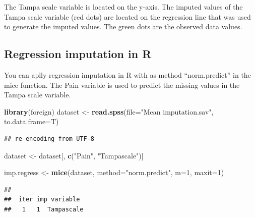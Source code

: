 \documentclass[]{book}
\newenvironment{Shaded}{\begin{snugshade}}{\end{snugshade}}
\newcommand{\KeywordTok}[1]{\textcolor[rgb]{0.13,0.29,0.53}{\textbf{#1}}}
\newcommand{\DataTypeTok}[1]{\textcolor[rgb]{0.13,0.29,0.53}{#1}}
\newcommand{\DecValTok}[1]{\textcolor[rgb]{0.00,0.00,0.81}{#1}}
\newcommand{\StringTok}[1]{\textcolor[rgb]{0.31,0.60,0.02}{#1}}
\newcommand{\CommentTok}[1]{\textcolor[rgb]{0.56,0.35,0.01}{\textit{#1}}}
\newcommand{\OperatorTok}[1]{\textcolor[rgb]{0.81,0.36,0.00}{\textbf{#1}}}
\newcommand{\NormalTok}[1]{#1}
\theoremstyle{definition}
\theoremstyle{definition}
\theoremstyle{definition}
\theoremstyle{remark}
\begin{document}
The Tampa scale variable is located on the y-axis. The imputed values of
the Tampa scale variable (red dots) are located on the regression line
that was used to generate the imputed values. The green dots are the
observed data values.

\subsection{Regression imputation in
R}\label{regression-imputation-in-r}

You can aplly regression imputation in R with as method ``norm.predict''
in the mice function. The Pain variable is used to predict the missing
values in the Tampa scale variable.

\begin{Shaded}
\begin{Highlighting}[]
\KeywordTok{library}\NormalTok{(foreign)}
\NormalTok{dataset <-}\StringTok{ }\KeywordTok{read.spss}\NormalTok{(}\DataTypeTok{file=}\StringTok{"Mean imputation.sav"}\NormalTok{, }\DataTypeTok{to.data.frame=}\NormalTok{T)}
\end{Highlighting}
\end{Shaded}

\begin{verbatim}
## re-encoding from UTF-8
\end{verbatim}

\begin{Shaded}
\begin{Highlighting}[]
\NormalTok{dataset <-}\StringTok{ }\NormalTok{dataset[, }\KeywordTok{c}\NormalTok{(}\StringTok{"Pain"}\NormalTok{, }\StringTok{"Tampascale"}\NormalTok{)]}

\NormalTok{imp.regress <-}\StringTok{ }\KeywordTok{mice}\NormalTok{(dataset, }\DataTypeTok{method=}\StringTok{"norm.predict"}\NormalTok{, }\DataTypeTok{m=}\DecValTok{1}\NormalTok{, }\DataTypeTok{maxit=}\DecValTok{1}\NormalTok{)}
\end{Highlighting}
\end{Shaded}

\begin{verbatim}
## 
##  iter imp variable
##   1   1  Tampascale
\end{verbatim}

\begin{Shaded}
\end{Shaded}
\end{document}
